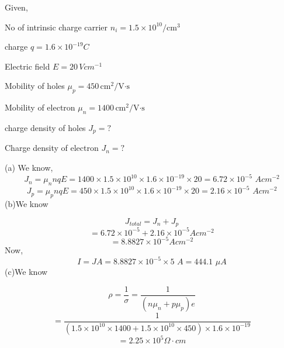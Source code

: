 \documentclass[a4aper,12pt]{report}
\begin{document}
\begin{tcolorbox}[breakable, 
    title = {\textbf{Question 1.2: }Consider an intrinsic silicon bar of cross-section $5\,\text{cm}^2$ and length $0.5\,\text{cm}$ at room temperature 300K. An average field of $20\,\text{V/cm}$ is applied across the ends of the silicon bar. \\[5pt]
    Calculate: 
    \begin{adjustwidth}{1cm}{5pt}
        a) Electron and hole components of current density.\par
        b) Total current in the bar.\par
        c) Resistivity of the bar. 
    \end{adjustwidth}
    Given, 
    \begin{adjustwidth}{1cm}{5pt}
        \begin{tabular}{ll}
            $\mu_n=1400\,\text{cm}^2/\text{V·s}$ & \hspace*{20pt}$n_i = 1.5\times 10^{10}/\text{cm}^3$ \\
            $\mu_p = 450\,\text{cm}^2/\text{V·s}$ 
        \end{tabular}
    \end{adjustwidth}
}]

Given,
\begin{adjustwidth}{1cm}{3pt}
    No of intrinsic charge carrier $n_i=1.5\times 10^{10}/\text{cm}^3$\par
    charge $q=1.6\times10^{-19}C$\par
    Electric field $E=20\,Vcm^{-1}$\par
    Mobility of holes $\mu_p = 450\,\text{cm}^2/\text{V·s}$\par 
Mobility of electron $\mu_n=1400\,\text{cm}^2/\text{V·s}$ \par
charge density of holes $J_p=?$\par
Charge density of electron $J_n=?$
\end{adjustwidth}
\vspace{1em}
(a) We know,
\[
J_n=\mu_n nqE
=1400\times 1.5\times 10^{10}\times1.6\times10^{-19}\times20
=6.72\times10^{-5}\,\, Acm^{-2}
\]
\[
J_p=\mu_p nqE
=450\times 1.5\times 10^{10}\times1.6\times10^{-19}\times20
=2.16\times10^{-5}\,\, Acm^{-2}
\]
(b)We know \par
\[
J_{total}=J_n+J_p
\]
\[
=6.72\times10^{-5}+2.16\times10^{-5}  Acm^{-2} \]
\[=8.8827\times10^{-5}  Acm^{-2}
\]
Now,
\[
I=JA=8.8827\times10^{-5}\times5 \,\,A=444.1 \,\,\mu A
\]
(c)We know\par
\[
\rho=\frac{1}{\sigma}=\frac{1}{(n\mu_n+p\mu_p)e}\]
\[=\frac{1}{(1.5\times 10^{10}\times 1400 + 1.5\times 10^{10}\times 450)\times 1.6\times 10^{-19}}
\]
\[
=2.25\times10^{5}\Omega\cdot cm
\]

\end{tcolorbox}
\end{document}
